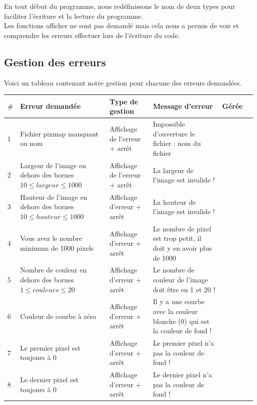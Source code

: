 \documentclass[11pt, a4paper, oneside]{article}   	%
\begin{document}
En tout début du programme, nous redéfinissons le nom de deux types pour faciliter l'écriture et la lecture du programme.\\

Les fonctions afficher ne sont pas demandé mais cela nous a permis de voir et comprendre les erreurs effectuer lors de l'écriture du code.

\subsection{Gestion des erreurs}

Voici un tableau contenant notre gestion pour chacune des erreurs demandées.

\begin{tabular}{ | l | p{4cm} | p{3cm} | p{4.5cm}  | l | l | }
\hline
	$\#$ & \textbf{Erreur demandée} &  \textbf{Type de gestion} &  \textbf{Message d'erreur} & \textbf{Gérée}   \\ \hline
	1 & Fichier pixmap manquant ou nom & Affichage de l'erreur + arrêt & Impossible d'ouverture le fichier : nom du fichier & \checkmark   \\ \hline
	2 & Largeur de l'image en dehors des bornes $10\leq largeur\leq 1000$ & Affichage de l'erreur + arrêt & La largeur de l'image est invalide ! & \checkmark   \\ \hline
	3 & Hauteur de l'image en dehors des bornes $10 \leq hauteur \leq 1000$ & Affichage d'erreur + arrêt & La hauteur de l'image est invalide ! & \checkmark   \\ \hline
	4 & Vous avez le nombre minimum de 1000 pixels & Affichage d'erreur + arrêt & Le nombre de pixel est trop petit, il doit y en avoir plus de 1000 & \checkmark   \\ \hline
	  5 & Nombre de couleur en dehors des bornes $1 \leq couleurs \leq 20$ & Affichage d'erreur + arrêt & Le nombre de couleur de l'image doit être en 1 et 20 ! & \checkmark   \\ \hline
	6 & Couleur de courbe à zéro  & Affichage d'erreur + arrêt & Il y a une courbe avec la couleur blanche (0) qui est la couleur de fond ! & \checkmark   \\ \hline	
	7 & Le premier pixel est toujours à 0 & Affichage d'erreur + arrêt & Le premier pixel n'a pas la couleur de fond ! & \checkmark   \\ \hline
	8 & Le dernier pixel est toujours à 0 & Affichage d'erreur + arrêt & Le dernier pixel n'a pas la couleur de fond ! & \checkmark   \\ \hline

\end{tabular}
\end{document}
